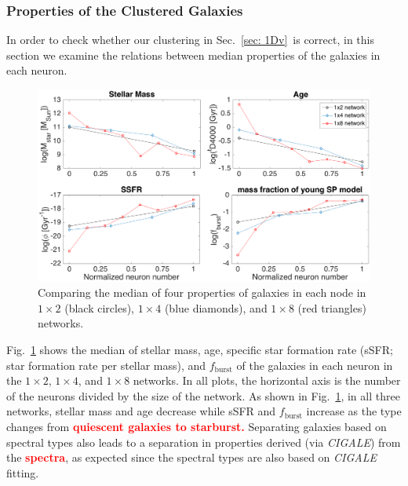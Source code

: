                         
        
        
        \subsubsection{Properties of the Clustered Galaxies}
        
       In order to check whether our clustering in Sec.~\ref{sec: 1Dv}~is correct, in this section we examine the relations between median properties of the galaxies in each neuron. 
        
        \begin{figure}
            \centering
            \includegraphics[width=\textwidth]{images0.01/1d/props5.png}
            \caption[The median of four properties of galaxies in three networks]{Comparing the median of four properties of galaxies in each node in $1\times2$ (black circles), $1\times4$ (blue diamonds), and $1\times8$ (red triangles) networks.}
            \label{fig: props}
        \end{figure}
       
        Fig.~\ref{fig: props} shows the median of stellar mass, age, specific star formation rate (sSFR; star formation rate per stellar mass), and $f_\mathrm{burst}$ of the galaxies in each neuron in the $1\times2$, $1\times4$, and $1\times8$ networks.
        In all plots, the horizontal axis is the number of the neurons divided by the size of the network.
        As shown in Fig.~\ref{fig: props}, in all three networks, stellar mass and age decrease while sSFR and $f_\mathrm{burst}$ increase as the type changes from \textbf{\textcolor{red}{quiescent galaxies to starburst.}}
       Separating galaxies based on spectral types also leads to a separation in properties derived (via {\em CIGALE}) from the \textbf{\textcolor{red}{spectra}}, as expected since the spectral types are also based on {\em CIGALE} fitting. 
    

